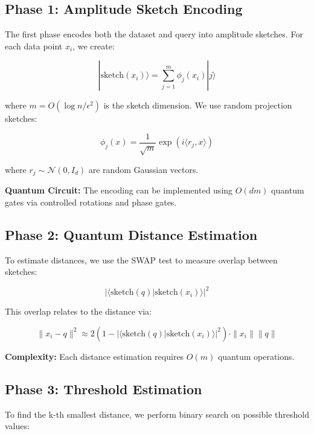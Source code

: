 \documentclass[11pt]{article}
\begin{document}
\subsection{Phase 1: Amplitude Sketch Encoding}

The first phase encodes both the dataset and query into amplitude sketches. For each data point $x_i$, we create:

\begin{equation}
|\text{sketch}(x_i)\rangle = \sum_{j=1}^m \phi_j(x_i) |j\rangle
\end{equation}

where $m = O(\log n / \epsilon^2)$ is the sketch dimension. We use random projection sketches:

\begin{equation}
\phi_j(x) = \frac{1}{\sqrt{m}} \exp(i \langle r_j, x \rangle)
\end{equation}

where $r_j \sim \mathcal{N}(0, I_d)$ are random Gaussian vectors.

\textbf{Quantum Circuit:} The encoding can be implemented using $O(dm)$ quantum gates via controlled rotations and phase gates.

\subsection{Phase 2: Quantum Distance Estimation}

To estimate distances, we use the SWAP test \cite{buhrman2001quantum} to measure overlap between sketches:

\begin{equation}
|\langle \text{sketch}(q) | \text{sketch}(x_i) \rangle|^2
\end{equation}

This overlap relates to the distance via:

\begin{equation}
\|x_i - q\|^2 \approx 2(1 - |\langle \text{sketch}(q) | \text{sketch}(x_i) \rangle|^2) \cdot \|x_i\| \|q\|
\end{equation}

\textbf{Complexity:} Each distance estimation requires $O(m)$ quantum operations.

\subsection{Phase 3: Threshold Estimation}

To find the k-th smallest distance, we perform binary search on possible threshold values:
\end{document}
